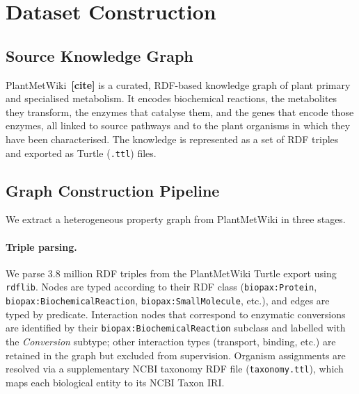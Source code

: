 
\newcommand{\TODO}[1]{\textcolor{todo}{\textbf{[#1]}}}

\appendix

\section{Dataset Construction}
\label{app:dataset}

\subsection{Source Knowledge Graph}

PlantMetWiki~\TODO{cite} is a curated, RDF-based knowledge graph of plant primary
and specialised metabolism.
It encodes biochemical reactions, the metabolites they transform, the enzymes that
catalyse them, and the genes that encode those enzymes, all linked to source pathways
and to the plant organisms in which they have been characterised.
The knowledge is represented as a set of RDF triples and exported as Turtle
(\texttt{.ttl}) files.

\subsection{Graph Construction Pipeline}

We extract a heterogeneous property graph from PlantMetWiki in three stages.

\paragraph{Triple parsing.}
We parse 3.8 million RDF triples from the PlantMetWiki Turtle export using
\texttt{rdflib}.
Nodes are typed according to their RDF class (\texttt{biopax:Protein},
\texttt{biopax:BiochemicalReaction}, \texttt{biopax:SmallMolecule}, etc.),
and edges are typed by predicate.
Interaction nodes that correspond to enzymatic conversions are identified by
their \texttt{biopax:BiochemicalReaction} subclass and labelled with the
\emph{Conversion} subtype; other interaction types (transport, binding, etc.)
are retained in the graph but excluded from supervision.
Organism assignments are resolved via a supplementary NCBI taxonomy RDF file
(\texttt{taxonomy.ttl}), which maps each biological entity to its NCBI Taxon IRI.

